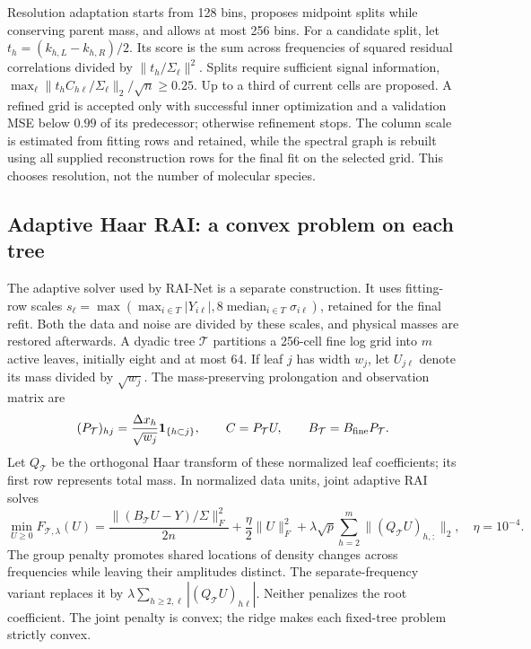 Resolution adaptation starts from 128 bins, proposes midpoint splits while conserving parent mass, and allows at most 256 bins. For a candidate split, let $t_h=(k_{h,L}-k_{h,R})/2$. Its score is the sum across frequencies of squared residual correlations divided by $\|t_h/\Sigma_\ell\|^2$. Splits require sufficient signal information, $\max_\ell\|t_h C_{h\ell}/\Sigma_\ell\|_2/\sqrt n\geq0.25$. Up to a third of current cells are proposed. A refined grid is accepted only with successful inner optimization and a validation MSE below $0.99$ of its predecessor; otherwise refinement stops. The column scale is estimated from fitting rows and retained, while the spectral graph is rebuilt using all supplied reconstruction rows for the final fit on the selected grid. This chooses resolution, not the number of molecular species.

\subsection{Adaptive Haar RAI: a convex problem on each tree}\label{sec:raiadaptive}
The adaptive solver used by RAI-Net is a separate construction. It uses fitting-row scales $s_\ell=\max(\max_{i\in T}|Y_{i\ell}|,8\operatorname{median}_{i\in T}\sigma_{i\ell})$, retained for the final refit. Both the data and noise are divided by these scales, and physical masses are restored afterwards. A dyadic tree $\mathcal T$ partitions a 256-cell fine log grid into $m$ active leaves, initially eight and at most 64. If leaf $j$ has width $w_j$, let $U_{j\ell}$ denote its mass divided by $\sqrt{w_j}$. The mass-preserving prolongation and observation matrix are
\begin{equation}\label{eq:raiprojection}
 (P_{\mathcal T})_{hj}=\frac{\Delta x_h}{\sqrt{w_j}}\mathbf{1}_{\{h\subset j\}},
 \qquad C=P_{\mathcal T}U,\qquad B_{\mathcal T}=B_{\rm fine}P_{\mathcal T}.
\end{equation}
Let $Q_{\mathcal T}$ be the orthogonal Haar transform of these normalized leaf coefficients; its first row represents total mass. In normalized data units, joint adaptive RAI solves
\begin{equation}\label{eq:raihaar}
 \min_{U\geq0} F_{\mathcal T,\lambda}(U)
 =\frac{\|(B_{\mathcal T}U-Y)/\Sigma\|_F^2}{2n}
 +\frac{\eta}{2}\|U\|_F^2
 +\lambda\sqrt p\sum_{h=2}^{m}\|(Q_{\mathcal T}U)_{h,:}\|_2,
 \quad \eta=10^{-4}.
\end{equation}
The group penalty promotes shared locations of density changes across frequencies while leaving their amplitudes distinct. The separate-frequency variant replaces it by $\lambda\sum_{h\geq2,\ell}|(Q_{\mathcal T}U)_{h\ell}|$. Neither penalizes the root coefficient. The joint penalty is convex; the ridge makes each fixed-tree problem strictly convex.

